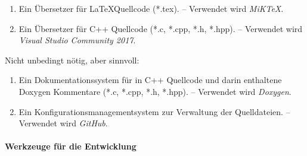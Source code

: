 \documentclass[english,ngerman,parskip=half,headsepline,footsepline,
	fleqn,notitlepage]{scrreprt}
\newcounter{Enumi}%
\begin{document}
	\begin{enumerate}

		\item\label{Werkzeug:LaTeX}
		Ein Übersetzer für \LaTeX Quellcode (*.tex).
		-- Verwendet wird \emph{MiK\TeX}.

		\item\label{Werkzeug:C++}
		Ein Übersetzer für C++ Quellcode (*.c, *.cpp, *.h, *.hpp).
		-- Verwendet wird \emph{Visual Studio Community 2017}.

		\setcounter{Enumi}{\value{enumi}}%
	\end{enumerate}
	Nicht unbedingt nötig, aber sinnvoll:
	\begin{enumerate}
		\setcounter{enumi}{\value{Enumi}}%

	\item\label{Werkzeug:Dokumentation}
	Ein Dokumentationssystem für in C++ Quellcode und darin enthaltene Doxygen Kommentare (*.c, *.cpp, *.h, *.hpp).
	-- Verwendet wird \emph{Doxygen}.

	\item\label{Werkzeug:Konfigurationsmanagement}
	Ein Konfigurationsmanagementsystem zur Verwaltung der Quelldateien.
	-- Verwendet wird \emph{GitHub}.

		\setcounter{Enumi}{\value{enumi}}%
	\end{enumerate}

	\paragraph{Werkzeuge für die Entwicklung}%
\end{document}
